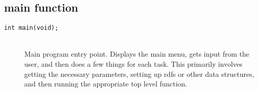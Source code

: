 \documentclass {book}
\newcommand {\ttt} {\texttt}
\begin{document}
\subsection{main function}

\begin{description}

\item[\ttt{int main(void);}]
\hfill \\
Main program entry point. Displays the main menu, gets input from the user, and then does a few things for each task. This primarily involves getting the necessary parameters, setting up rdfs or other data structures, and then running the appropriate top level function.

\end{description}
\end{document}
